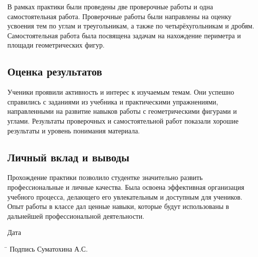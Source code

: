 \documentclass[a4paper,12pt]{article}
\begin{document}
В рамках практики были проведены две проверочные работы и одна самостоятельная работа. Проверочные работы были направлены на оценку усвоения тем по углам и треугольникам, а также по четырёхугольникам и дробям. Самостоятельная работа была посвящена задачам на нахождение периметра и площади геометрических фигур.

\subsection*{Оценка результатов}

Ученики проявили активность и интерес к изучаемым темам. Они успешно справились с заданиями из учебника и практическими упражнениями, направленными на развитие навыков работы с геометрическими фигурами и углами. Результаты проверочных и самостоятельной работ показали хорошие результаты и уровень понимания материала.

\subsection*{Личный вклад и выводы}

Прохождение практики позволило студентке значительно развить профессиональные и личные качества. Была освоена эффективная организация учебного процесса, делающего его увлекательным и доступным для учеников. Опыт работы в классе дал ценные навыки, которые будут использованы в дальнейшей профессиональной деятельности.

\vspace{10mm}

\noindent
Дата \underline{\hspace{5cm}}
\noindent
\begin{tabbing}
\hspace{2cm} \= \kill
Подпись \> \underline{\hspace{4cm}} Суматохина А.С.
\end{tabbing}
\end{document}
